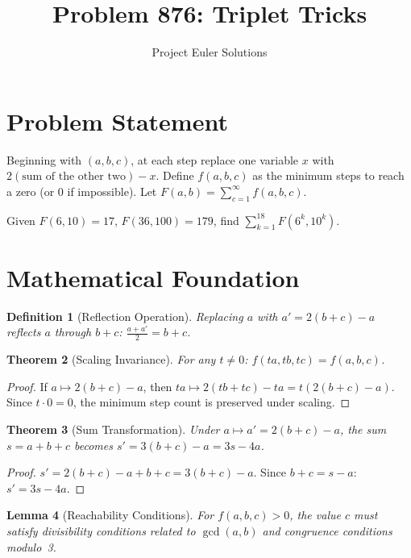 \documentclass[11pt]{article}
\title{Problem 876: Triplet Tricks}
\author{Project Euler Solutions}
\date{}
\newtheorem{theorem}{Theorem}
\newtheorem{lemma}[theorem]{Lemma}
\newtheorem{definition}[theorem]{Definition}
\begin{document}
\maketitle

\section{Problem Statement}

Beginning with $(a,b,c)$, at each step replace one variable $x$ with $2(\text{sum of the other two}) - x$. Define $f(a,b,c)$ as the minimum steps to reach a zero (or $0$ if impossible). Let $F(a,b) = \sum_{c=1}^{\infty} f(a,b,c)$.

Given $F(6,10)=17$, $F(36,100)=179$, find $\displaystyle\sum_{k=1}^{18} F(6^k, 10^k)$.

\section{Mathematical Foundation}

\begin{definition}[Reflection Operation]
Replacing $a$ with $a' = 2(b+c)-a$ reflects $a$ through $b+c$: $\frac{a+a'}{2} = b+c$.
\end{definition}

\begin{theorem}[Scaling Invariance]
For any $t \neq 0$: $f(ta, tb, tc) = f(a,b,c)$.
\end{theorem}

\begin{proof}
If $a \mapsto 2(b+c)-a$, then $ta \mapsto 2(tb+tc)-ta = t(2(b+c)-a)$. Since $t \cdot 0 = 0$, the minimum step count is preserved under scaling.
\end{proof}

\begin{theorem}[Sum Transformation]
Under $a \mapsto a' = 2(b+c)-a$, the sum $s = a+b+c$ becomes $s' = 3(b+c)-a = 3s - 4a$.
\end{theorem}

\begin{proof}
$s' = 2(b+c)-a+b+c = 3(b+c)-a$. Since $b+c = s-a$: $s' = 3s - 4a$.
\end{proof}

\begin{lemma}[Reachability Conditions]
For $f(a,b,c)>0$, the value $c$ must satisfy divisibility conditions related to $\gcd(a,b)$ and congruence conditions modulo~3.
\end{lemma}
\end{document}

